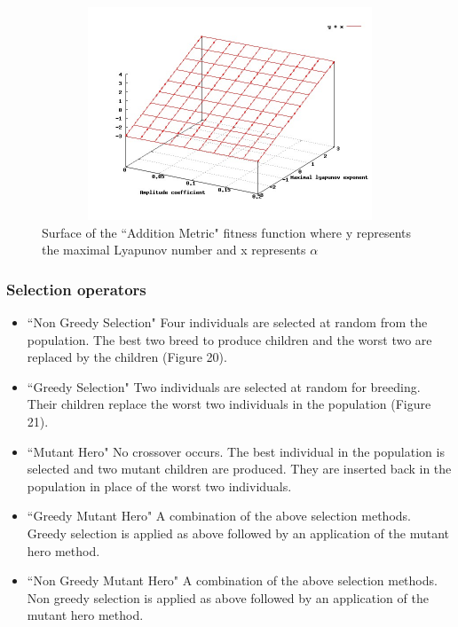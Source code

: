 \documentclass[12pt]{article}
\begin{document}
\begin{figure}[htb]
\begin{center}
\includegraphics[height=2.5in,width=4.5in]{images/fitness_surface1.jpg}
\caption{ Surface of the ``Addition Metric" fitness function where y represents the maximal Lyapunov number and x represents $\alpha$}
\end{center}
\end{figure}
\clearpage
\subsubsection{Selection operators}
\begin{itemize}
\item ``Non Greedy Selection"  Four individuals are selected at random from the population.  The best two breed to produce children and the worst two are
replaced by the children (Figure 20).
\item ``Greedy Selection"  Two individuals are selected at random for breeding.
Their children replace the worst two individuals in the population (Figure 21).
\item ``Mutant Hero"  No crossover occurs.  The best individual in the population
is selected and two mutant children are produced.  They are inserted back in the
population in place of the worst two individuals.
\item ``Greedy Mutant Hero"  A combination of the above selection methods.
Greedy selection is applied as above followed by an application of the mutant
hero method.
\item ``Non Greedy Mutant Hero"  A combination of the above selection methods.
Non greedy selection is applied as above followed by an application of the
mutant hero method.
\end{itemize}
\end{document}
